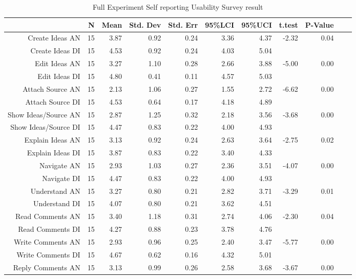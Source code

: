 \documentclass{sigchi}
\begin{document}
\begin{table}[ht]
\centering
\caption {Full Experiment Self reporting Usability Survey result }
\begin{tabular}{rrrrrrrrrrr}
  \hline
 & N & Mean & Std. Dev & Std. Err & 95\%LCI & 95\%UCI & t.test & P-Value \\ 
  \hline
  \hline
  Create Ideas AN & 15 & 3.87 & 0.92 & 0.24 & 3.36 & 4.37 & -2.32  & 0.04 \\ 
  Create Ideas DI & 15 & 4.53 & 0.92 & 0.24 & 4.03 & 5.04 &   &  \\ 
  \hline
  Edit Ideas AN & 15 & 3.27 & 1.10 & 0.28 & 2.66 & 3.88 &-5.00  & 0.00 \\ 
  Edit Ideas DI & 15 & 4.80 & 0.41 & 0.11 & 4.57 & 5.03 &   &  \\ 
    \hline
  Attach Source AN & 15 & 2.13 & 1.06 & 0.27 & 1.55 & 2.72 & -6.62   & 0.00 \\ 
  Attach Source DI & 15 & 4.53 & 0.64 & 0.17 & 4.18 & 4.89 &   &  \\ 
    \hline
  Show Ideas/Source AN & 15 & 2.87 & 1.25 & 0.32 & 2.18 & 3.56 & -3.68 & 0.00 \\ 
  Show Ideas/Source DI & 15 & 4.47 & 0.83 & 0.22 & 4.00 & 4.93 &  &  \\ 
    \hline
  Explain Ideas AN & 15 & 3.13 & 0.92 & 0.24 & 2.63 & 3.64 & -2.75  & 0.02 \\ 
  Explain Ideas DI & 15 & 3.87 & 0.83 & 0.22 & 3.40 & 4.33 &   &  \\ 
    \hline
  Navigate  AN & 15 & 2.93 & 1.03 & 0.27 & 2.36 & 3.51 & -4.07  & 0.00 \\ 
  Navigate  DI & 15 & 4.47 & 0.83 & 0.22 & 4.00 & 4.93 &   &  \\ 
    \hline
  Understand  AN & 15 & 3.27 & 0.80 & 0.21 & 2.82 & 3.71 & -3.29  & 0.01 \\ 
  Understand  DI & 15 & 4.07 & 0.80 & 0.21 & 3.62 & 4.51 &  &  \\ 
    \hline
  Read Comments AN & 15 & 3.40 & 1.18 & 0.31 & 2.74 & 4.06 & -2.30   & 0.04 \\ 
  Read Comments  DI & 15 & 4.27 & 0.88 & 0.23 & 3.78 & 4.76 &    &  \\ 
    \hline
  Write Comments AN & 15 & 2.93 & 0.96 & 0.25 & 2.40 & 3.47 & -5.77 & 0.00 \\ 
  Write Comments  DI & 15 & 4.67 & 0.62 & 0.16 & 4.32 & 5.01 &   &  \\ 
    \hline
  Reply Comments AN & 15 & 3.13 & 0.99 & 0.26 & 2.58 & 3.68 & -3.67  & 0.00 \\ 

\end{tabular}
\end{table}
\end{document}
